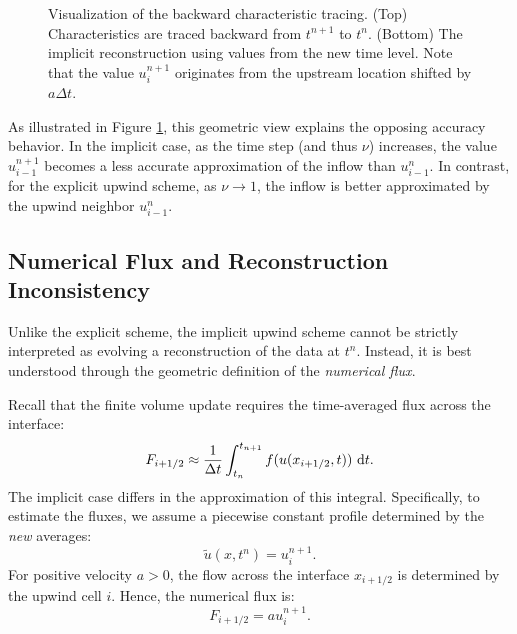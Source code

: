 \begin{figure}[htbp]
    \centering

    \begin{subfigure}[b]{\textwidth}
        \centering
        
    \end{subfigure}

    \vspace{1cm}
    
    \begin{subfigure}[b]{\textwidth}
        \centering
        
    \end{subfigure}

    \caption{Visualization of the backward characteristic tracing.
        (Top) Characteristics are traced backward from \(t^{n+1}\) to \(t^n\).
        (Bottom) The implicit reconstruction using values from the new time level.
        Note that the value \(u_i^{n+1}\) originates from the upstream location shifted by \(a\Delta t\).}
    \label{fig:backtrace}
\end{figure}

As illustrated in Figure \ref{fig:backtrace}, this geometric view explains the opposing accuracy behavior.
In the implicit case, as the time step (and thus \(\nu\)) increases, the value \(u_{i-1}^{n+1}\) becomes a less accurate approximation of the inflow than \(u_{i-1}^{n}\).
In contrast, for the explicit upwind scheme, as \(\nu \to 1\), the inflow is better approximated by the upwind neighbor \(u_{i-1}^{n}\).

\subsection{Numerical Flux and Reconstruction Inconsistency}%
\label{sub:implicit_upwind_flux}

Unlike the explicit scheme, the implicit upwind scheme cannot be strictly interpreted as evolving a reconstruction of the data at \(t^n\).
Instead, it is best understood through the geometric definition of the \textit{numerical flux}.

Recall that the finite volume update requires the time-averaged flux across the interface:
\[
    F_{i+1/2} \approx \frac{1}{\Delta t} \int_{t_n}^{t_{n+1}} f(u(x_{i+1/2}, t)) \, \operatorname{d}\! t.
\]
The implicit case differs in the approximation of this integral.
Specifically, to estimate the fluxes, we assume a piecewise constant profile determined by the \textit{new} averages:
\[
    \tilde{u}(x,t^n) = u_{i}^{n+1}.
\]
For positive velocity \(a > 0\), the flow across the interface \(x_{i+1/2}\) is determined by the upwind cell \(i\). Hence, the numerical flux is:
\begin{equation}
    \label{eq:implicit-upwind-flux}
    F_{i+1/2} = a u_{i}^{n+1}.
\end{equation}

